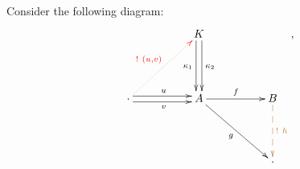 \documentclass{article}
\begin{document}
  Consider the following diagram:
  \[
  \xymatrixcolsep{1.8cm}
  \xymatrixrowsep{1.56cm}
  \xymatrix{
  & {K} \ar@<0.6ex>[d]^{\kappa_2} \ar@<-0.6ex>[d]_{\kappa_1} \\
  {\cdot} \ar@[red]@{.>}[ur]^{\color{red}!~(u, v)} \ar@<0.6ex>[r]^u
  \ar@<-0.6ex>[r]_v & {A} \ar[r]^f \ar[dr]_g & {B}
  \ar@[brown]@{-->}[d]^{\color{brown}!~ h}\\
  & & {\cdot}
  },
  \]
\end{document}
